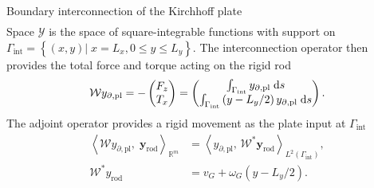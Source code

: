 \documentclass[aspectratio=169]{ISAE-Beamer}
\begin{document}
\begin{frame}{Boundary interconnection of the Kirchhoff plate}
\begin{equation*}
\begin{aligned}
\end{aligned}
\end{equation*}
Space $\mathscr{Y}$ is the space of square-integrable functions with support on $\Gamma_{\text{int}} = \left\{ (x,y) \vert \; x=L_x, 0 \le y \le L_y  \right\}$.
 The interconnection operator then provides the total force and torque acting on the rigid rod
\begin{equation*}
\mathcal{W} y_{\partial, \text{pl}} =  - \begin{pmatrix}
F_z \\
T_x \\
\end{pmatrix} = \begin{pmatrix}
\int_{\Gamma_{\text{int}}} y_{\partial, \text{pl}} \d{s} \\
\int_{\Gamma_{\text{int}}} \left( y - L_y/2 \right) y_{\partial, \text{pl}} \d{s} \\
\end{pmatrix}.
\end{equation*}
The adjoint operator provides a rigid movement as the plate input at $\Gamma_{\text{int}}$
\begin{align*}
\left\langle \mathcal{W} y_{\partial, \text{pl}}, \; \bm{y}_{\text{rod}} \right\rangle_{\mathbb{R}^m} &= \left\langle y_{\partial, \text{pl}}, \, \mathcal{W}^* \bm{y}_{\text{rod}}\right\rangle_{L^2(\Gamma_{\text{int}})}, \\
\mathcal{W}^* {y}_{\text{rod}} &= v_G + \omega_{G} \left( y - L_y/2 \right).
\end{align*}
\end{frame}
\end{document}
